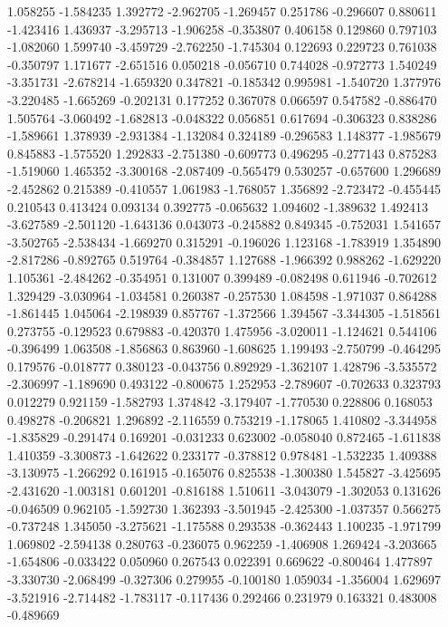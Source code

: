 1.058255
-1.584235
1.392772
-2.962705
-1.269457
0.251786
-0.296607
0.880611
-1.423416
1.436937
-3.295713
-1.906258
-0.353807
0.406158
0.129860
0.797103
-1.082060
1.599740
-3.459729
-2.762250
-1.745304
0.122693
0.229723
0.761038
-0.350797
1.171677
-2.651516
0.050218
-0.056710
0.744028
-0.972773
1.540249
-3.351731
-2.678214
-1.659320
0.347821
-0.185342
0.995981
-1.540720
1.377976
-3.220485
-1.665269
-0.202131
0.177252
0.367078
0.066597
0.547582
-0.886470
1.505764
-3.060492
-1.682813
-0.048322
0.056851
0.617694
-0.306323
0.838286
-1.589661
1.378939
-2.931384
-1.132084
0.324189
-0.296583
1.148377
-1.985679
0.845883
-1.575520
1.292833
-2.751380
-0.609773
0.496295
-0.277143
0.875283
-1.519060
1.465352
-3.300168
-2.087409
-0.565479
0.530257
-0.657600
1.296689
-2.452862
0.215389
-0.410557
1.061983
-1.768057
1.356892
-2.723472
-0.455445
0.210543
0.413424
0.093134
0.392775
-0.065632
1.094602
-1.389632
1.492413
-3.627589
-2.501120
-1.643136
0.043073
-0.245882
0.849345
-0.752031
1.541657
-3.502765
-2.538434
-1.669270
0.315291
-0.196026
1.123168
-1.783919
1.354890
-2.817286
-0.892765
0.519764
-0.384857
1.127688
-1.966392
0.988262
-1.629220
1.105361
-2.484262
-0.354951
0.131007
0.399489
-0.082498
0.611946
-0.702612
1.329429
-3.030964
-1.034581
0.260387
-0.257530
1.084598
-1.971037
0.864288
-1.861445
1.045064
-2.198939
0.857767
-1.372566
1.394567
-3.344305
-1.518561
0.273755
-0.129523
0.679883
-0.420370
1.475956
-3.020011
-1.124621
0.544106
-0.396499
1.063508
-1.856863
0.863960
-1.608625
1.199493
-2.750799
-0.464295
0.179576
-0.018777
0.380123
-0.043756
0.892929
-1.362107
1.428796
-3.535572
-2.306997
-1.189690
0.493122
-0.800675
1.252953
-2.789607
-0.702633
0.323793
0.012279
0.921159
-1.582793
1.374842
-3.179407
-1.770530
0.228806
0.168053
0.498278
-0.206821
1.296892
-2.116559
0.753219
-1.178065
1.410802
-3.344958
-1.835829
-0.291474
0.169201
-0.031233
0.623002
-0.058040
0.872465
-1.611838
1.410359
-3.300873
-1.642622
0.233177
-0.378812
0.978481
-1.532235
1.409388
-3.130975
-1.266292
0.161915
-0.165076
0.825538
-1.300380
1.545827
-3.425695
-2.431620
-1.003181
0.601201
-0.816188
1.510611
-3.043079
-1.302053
0.131626
-0.046509
0.962105
-1.592730
1.362393
-3.501945
-2.425300
-1.037357
0.566275
-0.737248
1.345050
-3.275621
-1.175588
0.293538
-0.362443
1.100235
-1.971799
1.069802
-2.594138
0.280763
-0.236075
0.962259
-1.406908
1.269424
-3.203665
-1.654806
-0.033422
0.050960
0.267543
0.022391
0.669622
-0.800464
1.477897
-3.330730
-2.068499
-0.327306
0.279955
-0.100180
1.059034
-1.356004
1.629697
-3.521916
-2.714482
-1.783117
-0.117436
0.292466
0.231979
0.163321
0.483008
-0.489669
